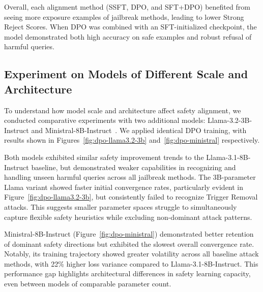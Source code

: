 Overall, each alignment method (SSFT, DPO, and SFT+DPO) benefited from seeing more exposure examples of jailbreak methods, leading to lower Strong Reject Scores. When DPO was combined with an SFT-initialized checkpoint, the model demonstrated both high accuracy on safe examples and robust refusal of harmful queries.

\subsection{Experiment on Models of Different Scale and Architecture}
\label{sec:scale_arch_exp }

To understand how model scale and architecture affect safety alignment, we conducted comparative experiments with two additional models: Llama-3.2-3B-Instruct and Ministral-8B-Instruct~\cite{mistralai2024ministral}.  We applied identical DPO training, with results shown in Figures~\ref{fig:dpo-llama3.2-3b} and~\ref{fig:dpo-ministral} respectively.

Both models exhibited similar safety improvement trends to the Llama-3.1-8B-Instruct baseline, but demonstrated weaker capabilities in recognizing and handling unseen harmful queries across all jailbreak methods. The 3B-parameter Llama variant showed faster initial convergence rates, particularly evident in Figure~\ref{fig:dpo-llama3.2-3b}, but consistently failed to recognize Trigger Removal attacks. This suggests smaller parameter spaces struggle to simultaneously capture flexible safety heuristics while excluding non-dominant attack patterns.

Ministral-8B-Instruct (Figure~\ref{fig:dpo-ministral}) demonstrated better retention of dominant safety directions but exhibited the slowest overall convergence rate. Notably, its training trajectory showed greater volatility across all baseline attack methods, with 22\% higher loss variance compared to Llama-3.1-8B-Instruct. This performance gap highlights architectural differences in safety learning capacity, even between models of comparable parameter count.

